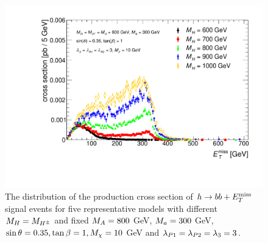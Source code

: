 \begin{figure}[tbp]
\centering
\includegraphics[width=\textwidth]{texinputs/04_grid/figures/monoHbb_mH_scan_MET_liny.pdf}
\caption[$\MET$ distribution in  $h\rightarrow bb + \MET$ events for different $\mH$]
{The \MET distribution of the production cross section of $h\rightarrow bb + \MET$ signal events for five representative models with different $M_{H} = M_{H^{\pm}}$ 
and fixed $ M_{A}=800$ GeV, $M_{a} = 300 $ GeV,  $ \sin\theta = 0.35, \tan\beta = 1, M_{\chi} = 10$ GeV and $ \lambda_{P1} = \lambda_{P2} = \lambda_{3} = 3 $. 
%
}
\label{fig:monoHbb_mH_scan_met}
\end{figure}
